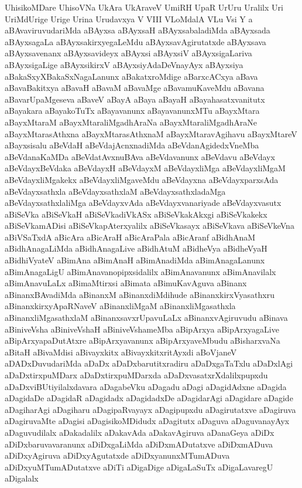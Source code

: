 {UhisikoMDare
UhisoVNa
UkAra
UkAraveV
UmiRH
UpaR
UrUru
Uralilx
Uri
UriMdUrige
Urige
Urina
Urudavxya
V
VIII
VLoMdalA
VLu
Vsi
Y
a
aBAvaviruvudariMda
aBAyxsa
aBAyxsaH
aBAyxsabaladiMda
aBAyxsada
aBAyxsagaLa
aBAyxsakirxyegaLeMdu
aBAyxsavAgirutatxde
aBAyxsava
aBAyxsavenanx
aBAyxsavideyx
aBAyxsi
aBAyxsiV
aBAyxsigaLariva
aBAyxsigaLige
aBAyxsikirxV
aBAyxsiyAdaDeVnayAyx
aBAyxsiya
aBakaSxyXBakaSxNagaLanunx
aBakatxroMdige
aBarxcACxya
aBava
aBavaBakitxya
aBavaH
aBavaM
aBavaMge
aBavamuKaveMdu
aBavana
aBavarUpaMgeseva
aBaveV
aBayA
aBaya
aBayaH
aBayahasatxvanitutx
aBayakara
aBayakoTuTx
aBayavanunx
aBayavanunxMTu
aBayxMtara
aBayxMtaraM
aBayxMtaraliMgadhAraNa
aBayxMtaraliMgadhAraNe
aBayxMtarasAthxna
aBayxMtarasAthxnaM
aBayxMtaravAgihavu
aBayxMtareV
aBayxsisalu
aBeVdaH
aBeVdajAcnxnadiMda
aBeVdanAgidedxVneMba
aBeVdanaKaMDa
aBeVdatAvxnuBAva
aBeVdavanunx
aBeVdavu
aBeVdayx
aBeVdayxBeVdaka
aBeVdayxH
aBeVdayxM
aBeVdayxliMga
aBeVdayxliMgaM
aBeVdayxliMgakekx
aBeVdayxliMgaveMdu
aBeVdayxna
aBeVdayxparxsAda
aBeVdayxsathxla
aBeVdayxsathxlaM
aBeVdayxsathxladaMga
aBeVdayxsathxlaliMga
aBeVdayxvAda
aBeVdayxvanariyade
aBeVdayxvasutx
aBiSeVka
aBiSeVkaH
aBiSeVkadiVkASx
aBiSeVkakAkxgi
aBiSeVkakekx
aBiSeVkamADisi
aBiSeVkapAterxyalilx
aBiSeVkasayx
aBiSeVkava
aBiSeVkeVna
aBiVSaTxdA
aBicAra
aBicAraH
aBicAraPala
aBicAranf
aBidhAnaM
aBidhAnagaLiMda
aBidhAnagaLive
aBidhAtuM
aBidheVya
aBidheVyaH
aBidhiVyateV
aBimAna
aBimAnaH
aBimAnadiMda
aBimAnagaLanunx
aBimAnagaLigU
aBimAnavanopipxsidalilx
aBimAnavanunx
aBimAnavilalx
aBimAnavuLaLx
aBimaMtirxsi
aBimata
aBimuKavAguva
aBinanx
aBinanxBAvadiMda
aBinanxM
aBinanxdiMdihude
aBinanxkirxVyasathxru
aBinanxkirxyApaRNaveV
aBinanxliMgaM
aBinanxliMgasathxla
aBinanxliMgasathxlaM
aBinanxsavxrUpavuLaLx
aBinanxvAgiruvudu
aBinava
aBiniveVsha
aBiniveVshaH
aBiniveVshameMba
aBipArxya
aBipArxyagaLive
aBipArxyapaDutAtxre
aBipArxyavanunx
aBipArxyaveMbudu
aBisharxvaNa
aBitaH
aBivaMdisi
aBivayxkitx
aBivayxkitxritAyxdi
aBoVjaneV
aDADxDuvudariMda
aDaDx
aDaDxbarutitxradiru
aDaDxgaTaTxlu
aDaDxlAgi
aDaDxtirxpuMDarx
aDaDxtirxpuMDarxda
aDaDxvasatxrXdalilxpupxdu
aDaDxviBUtiyilalxdavara
aDagabeVku
aDagadu
aDagi
aDagidAdxne
aDagida
aDagidaDe
aDagidaR
aDagidadx
aDagidadxDe
aDagidarAgi
aDagidare
aDagide
aDagiharAgi
aDagiharu
aDagipaRvayayx
aDagipupxdu
aDagirutatxve
aDagiruva
aDagiruvaMte
aDagisi
aDagisikoMDidudx
aDagitutx
aDaguva
aDaguvanayAyx
aDaguvudilalx
aDakadalilx
aDakavAda
aDakavAgiruva
aDanaGeya
aDiDx
aDiDxbaruvavaranunx
aDiDxgaLiMda
aDiDxmADutatxve
aDiDxmADuva
aDiDxyAgiruva
aDiDxyAgutatxde
aDiDxyanunxMTumADuva
aDiDxyuMTumADutatxve
aDiTi
aDigaDige
aDigaLaSuTx
aDigaLavaregU
aDigalalx
}
